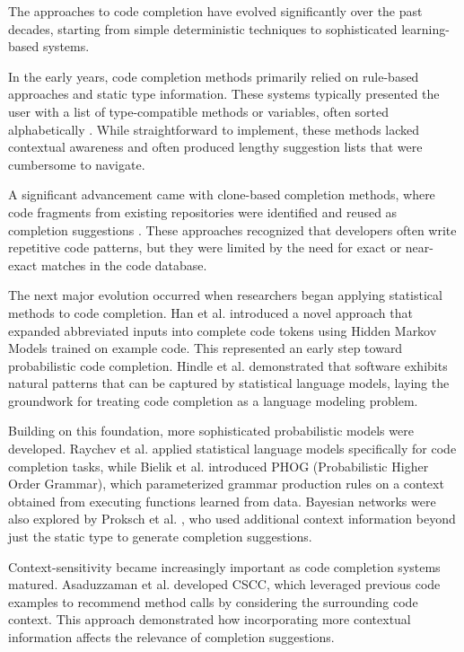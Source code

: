 The approaches to code completion have evolved significantly over the past decades, starting from simple deterministic techniques to sophisticated learning-based systems.

In the early years, code completion methods primarily relied on rule-based approaches and static type information. These systems typically presented the user with a list of type-compatible methods or variables, often sorted alphabetically \cite{mandelin2005}. While straightforward to implement, these methods lacked contextual awareness and often produced lengthy suggestion lists that were cumbersome to navigate.

A significant advancement came with clone-based completion methods, where code fragments from existing repositories were identified and reused as completion suggestions \cite{hill2004}. These approaches recognized that developers often write repetitive code patterns, but they were limited by the need for exact or near-exact matches in the code database.

The next major evolution occurred when researchers began applying statistical methods to code completion. Han et al. \cite{han2009} introduced a novel approach that expanded abbreviated inputs into complete code tokens using Hidden Markov Models trained on example code. This represented an early step toward probabilistic code completion. Hindle et al. \cite{hindle2012} demonstrated that software exhibits natural patterns that can be captured by statistical language models, laying the groundwork for treating code completion as a language modeling problem.

Building on this foundation, more sophisticated probabilistic models were developed. Raychev et al. \cite{raychev2014} applied statistical language models specifically for code completion tasks, while Bielik et al. \cite{bielik2016} introduced PHOG (Probabilistic Higher Order Grammar), which parameterized grammar production rules on a context obtained from executing functions learned from data. Bayesian networks were also explored by Proksch et al. \cite{proksch2015}, who used additional context information beyond just the static type to generate completion suggestions.

Context-sensitivity became increasingly important as code completion systems matured. Asaduzzaman et al. \cite{asaduzzaman2014} developed CSCC, which leveraged previous code examples to recommend method calls by considering the surrounding code context. This approach demonstrated how incorporating more contextual information affects the relevance of completion suggestions.

